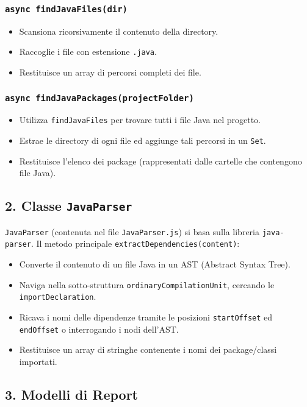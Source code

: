 \documentclass[a4paper,12pt]{article}
\begin{document}
\subsubsection*{\texttt{async findJavaFiles(dir)}}
\begin{itemize}
  \item Scansiona ricorsivamente il contenuto della directory.
  \item Raccoglie i file con estensione \texttt{.java}.
  \item Restituisce un array di percorsi completi dei file.
\end{itemize}

\subsubsection*{\texttt{async findJavaPackages(projectFolder)}}
\begin{itemize}
  \item Utilizza \texttt{findJavaFiles} per trovare tutti i file Java nel progetto.
  \item Estrae le directory di ogni file ed aggiunge tali percorsi in un \texttt{Set}.
  \item Restituisce l'elenco dei package (rappresentati dalle cartelle che contengono file Java).
\end{itemize}

\subsection{2. Classe \texttt{JavaParser}}
\texttt{JavaParser} (contenuta nel file \texttt{JavaParser.js}) si basa sulla libreria \texttt{java-parser}. Il metodo principale \texttt{extractDependencies(content)}:
\begin{itemize}
  \item Converte il contenuto di un file Java in un AST (Abstract Syntax Tree).
  \item Naviga nella sotto-struttura \texttt{ordinaryCompilationUnit}, cercando le \texttt{importDeclaration}.
  \item Ricava i nomi delle dipendenze tramite le posizioni \texttt{startOffset} ed \texttt{endOffset} o interrogando i nodi dell'AST.
  \item Restituisce un array di stringhe contenente i nomi dei package/classi importati.
\end{itemize}

\subsection{3. Modelli di Report}
\label{sec:reports}
\end{document}
